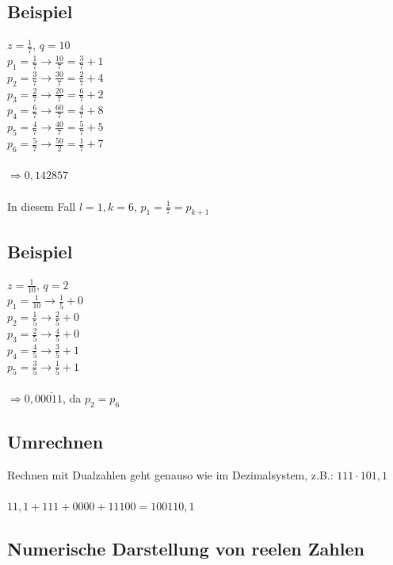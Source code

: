 \documentclass{llncs}
\begin{document}
\subsection*{Beispiel}

$z = \frac{1}{7}$, $q = 10$\\
$p_1 = \frac{1}{7} \longrightarrow \frac{10}{7} = \frac{3}{7}+1$\\
$p_2 = \frac{3}{7} \longrightarrow \frac{30}{7} = \frac{2}{7}+4$\\
$p_3 = \frac{2}{7} \longrightarrow \frac{20}{7} = \frac{6}{7}+2$\\
$p_4 = \frac{6}{7} \longrightarrow \frac{60}{7} = \frac{4}{7}+8$\\
$p_5 = \frac{4}{7} \longrightarrow \frac{40}{7} = \frac{5}{7}+5$\\
$p_6 = \frac{5}{7} \longrightarrow \frac{50}{2} = \frac{1}{7}+7$\\
\\
$\Rightarrow 0,\overline{142857}$\\
\\
In diesem Fall $l=1, k=6$, $p_1 = \frac{1}{7} = p_{k+1}$

\subsection*{Beispiel}

$z = \frac{1}{10}$, $q = 2$\\
$p_1 = \frac{1}{10} \longrightarrow \frac{1}{5}+0$\\
$p_2 = \frac{1}{5} \longrightarrow \frac{2}{5}+0$\\
$p_3 = \frac{2}{5} \longrightarrow \frac{4}{5}+0$\\
$p_4 = \frac{4}{5} \longrightarrow \frac{3}{5}+1$\\
$p_5 = \frac{3}{5} \longrightarrow \frac{1}{5}+1$\\
\\
$\Rightarrow 0,0\overline{0011}$, da $p_2 = p_6$

\subsection*{Umrechnen}

Rechnen mit Dualzahlen geht genauso wie im Dezimalsystem, z.B.: $111 \cdot 101,1$\\
\\
$11,1 + 111 + 0000 + 11100 = 100110,1$

\subsection*{Numerische Darstellung von reelen Zahlen}
\end{document}

